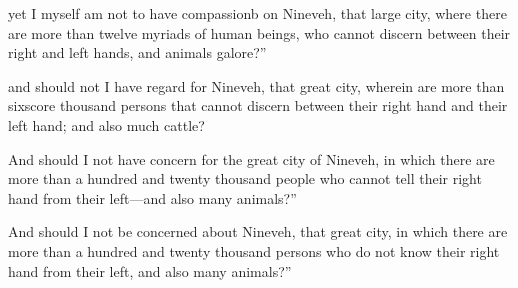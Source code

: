 			\begin{versebox}
					\item[BHS] 
					\item[LXX] 
					\item[AB 1990 300] yet I myself am not to have compassionb on Nineveh, that large city, where there are more than twelve myriads of human beings, who cannot discern between their right and left hands, and animals galore?''
					\item[ASV] and should not I have regard for Nineveh, that great city, wherein are more than sixscore thousand persons that cannot discern between their right hand and their left hand; and also much cattle?
					\item[NIV] And should I not have concern for the great city of Nineveh, in which there are more than a hundred and twenty thousand people who cannot tell their right hand from their left—and also many animals?”
					\item[NRSV] And should I not be concerned about Nineveh, that great city, in which there are more than a hundred and twenty thousand persons who do not know their right hand from their left, and also many animals?”
			\end{versebox}